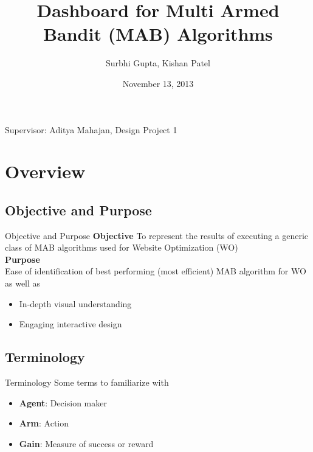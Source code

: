 \documentclass{beamer}
\begin{document}
\title[Dashboard for MAB Algorithms]{Dashboard for Multi Armed Bandit (MAB) Algorithms}
\author[Surbhi Gupta, Kishan Patel]{Surbhi Gupta, Kishan Patel}
\date{November 13, 2013}

\begin{frame}
\titlepage
\begin{center}
Supervisor: Aditya Mahajan, Design Project 1
\end{center}
\end{frame}

\begin{frame}
\tableofcontents
\end{frame}

\section{Overview}

\subsection{Objective and Purpose}
\begin{frame}{Objective and Purpose}
\textbf{Objective}
\newline To represent the results of executing a generic class of
MAB algorithms used for Website Optimization (WO)
\newline
\\\textbf{Purpose}
\\Ease of identification of best performing (most efficient) MAB algorithm for WO as well as
\begin{itemize}
  \item In-depth visual understanding
  \item Engaging interactive design
\end{itemize}
\end{frame}

\subsection{Terminology}
\begin{frame}{Terminology}
Some terms to familiarize with 
\begin{itemize}
  \item \textbf{Agent}: Decision maker
  \item \textbf{Arm}: Action 
  \item \textbf{Gain}: Measure of success or reward
\end{itemize}
\end{frame}
\end{document}

